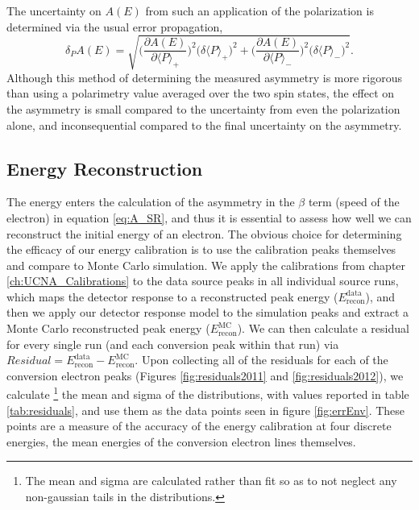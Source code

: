 The uncertainty on $A(E)$ from such an application of the polarization is determined via
the usual error propagation,
%
\begin{equation}
  \delta_PA(E) = \sqrt{\bigg(\frac{\partial A(E)}{\partial \langle P \rangle_+}\bigg)^2
    \Big(\delta \langle P \rangle_+\Big)^2 +
    \bigg( \frac{\partial A(E)}{\partial \langle P \rangle_-}\bigg)^2
    \Big(\delta \langle P \rangle_-\Big)^2}.
\end{equation}
%
Although this method of determining the measured asymmetry is more rigorous than using a
polarimetry value averaged over the two spin states, the effect on the asymmetry is small
compared to the uncertainty from even the polarization alone, and inconsequential compared
to the final uncertainty on the asymmetry.


\subsection{Energy Reconstruction} \label{ssec:energyRecon}

The energy enters the calculation of the asymmetry in the $\beta$ term (speed of the
electron) in equation \ref{eq:A_SR}, and thus it is essential to assess how well
we can reconstruct the initial energy of an electron. The obvious choice for determining
the efficacy of our energy calibration is to use the calibration peaks themselves and
compare to Monte Carlo simulation. We apply the calibrations from
chapter \ref{ch:UCNA_Calibrations} to the data source peaks in all
individual source runs,
which maps the detector response to a reconstructed peak energy ($E_{\mathrm{recon}}^{\mathrm{data}}$),
and then we apply our
detector response model to the simulation peaks and extract a Monte Carlo reconstructed peak energy
($E_{\mathrm{recon}}^{\mathrm{MC}}$). We can then calculate a residual for every single run (and each
conversion peak within that run) via
$Residual = E_{\mathrm{recon}}^{\mathrm{data}} - E_{\mathrm{recon}}^{\mathrm{MC}}$. Upon collecting all
of the residuals for each of the conversion electron peaks (Figures \ref{fig:residuals2011}
and \ref{fig:residuals2012}), we calculate
\footnote{The mean and sigma are calculated rather than fit so as to not neglect any
  non-gaussian tails in the distributions.} the mean and sigma of the distributions, with
values reported in table \ref{tab:residuals}, and use
them as the data points seen in figure \ref{fig:errEnv}. These points are a measure
of the accuracy of the energy calibration at four discrete energies, the mean energies of the
conversion electron lines themselves.

